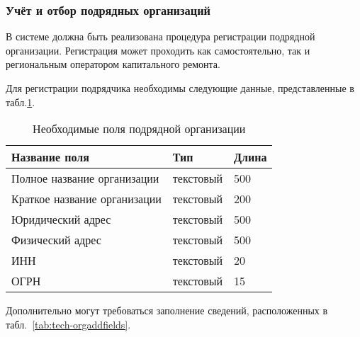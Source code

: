 \subsubsection{Учёт и отбор подрядных организаций}

В системе должна быть реализована процедура регистрации подрядной организации.
Регистрация может проходить как самостоятельно, так и региональным оператором капитального ремонта.

Для регистрации подрядчика необходимы следующие данные, представленные в табл.\ref{tab:tech-orgfields}.

\begin{footnotesize}
\begin{longtable}[h]{|p{}|p{}|p{}|}
	\caption{\label{tab:tech-orgfields}Необходимые поля подрядной организации} \\
	\hline
		\textbf{Название поля} & \textbf{Тип} & \textbf{Длина} \\
	\hline \endhead
		Полное название организации & текстовый & 500 \\
	\hline
		Краткое название организации & текстовый & 200 \\
	\hline
		Юридический адрес & текстовый & 500 \\
	\hline
		Физический адрес & текстовый & 500 \\
	\hline
		ИНН & текстовый & 20 \\
	\hline
		ОГРН & текстовый & 15 \\
	\hline
\end{longtable}
\end{footnotesize}

Дополнительно могут требоваться заполнение сведений, расположенных в табл.~\ref{tab:tech-orgaddfields}.

